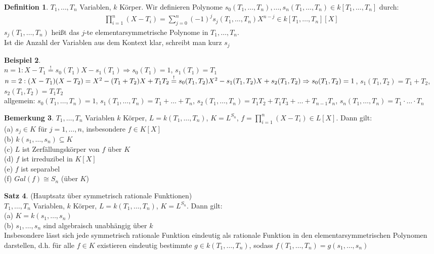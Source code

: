 \documentclass[10pt,a4paper,numbers=endperiod]{scrreprt}
\theoremstyle{definition}
\newtheorem{satz}{Satz}[section]
\newtheorem{defi}[satz]{Definition}
\newtheorem{bem}[satz]{Bemerkung}
\newtheorem{bsp}[satz]{Beispiel}
\begin{document}
\begin{defi}
	$T_1, \ldots, T_n$ Variablen, $k$ Körper. Wir definieren Polynome $s_0(T_1, \ldots, T_n), \ldots, s_n(T_1, \ldots, T_n) \in k[T_1, \ldots, T_n]$ durch:
	\begin{align*}
		\prod\limits_{i = 1}^n (X - T_i) = \sum\limits_{j = 0}^n (-1)^j s_j(T_1, \ldots, T_n) X^{n-j} \in k[T_1, \ldots, T_n][X]
	\end{align*}
	$s_j(T_1, \ldots, T_n)$ heißt das $j$-te elementarsymmetrische Polynome in $T_1, \ldots, T_n$.\\
	Ist die Anzahl der Variablen aus dem Kontext klar, schreibt man kurz $s_j$
\end{defi}

\begin{bsp}
	$ $\\
	$n = 1: X - T_1 \overset{!}{=} s_0(T_1) X - s_1(T_1) \Rightarrow s_0(T_1) = 1$, $s_1(T_1) = T_1$\\
	$n = 2: (X-T_1)(X-T_2) = X^2 - (T_1 + T_2)X + T_1T_2 \overset{!}{=} s_0(T_1,T_2)X^2 - s_1(T_1,T_2)X + s_2(T_1,T_2)\\
	\Rightarrow s_0(T_1,T_2) = 1$, $s_1(T_1,T_2) = T_1 + T_2$, $s_2(T_1,T_2) = T_1T_2$\\
	allgemein: $s_0(T_1, \ldots, T_n) = 1$, $s_1(T_1, \ldots, T_n) = T_1 + \ldots + T_n$, $s_2(T_1, \ldots, T_n) = T_1T_2 + T_1T_3 + \ldots + T_{n-1}T_n$, $s_n(T_1, \ldots, T_n) = T_1 \cdot \ldots \cdot T_n$
\end{bsp}

\begin{bem}
	$T_1, \ldots, T_n$ Variablen $k$ Körper, $L = k(T_1, \ldots, T_n)$, $K = L^{S_n}$, $f = \prod\limits_{i = 1}^n(X- T_i) \in L[X]$. Dann gilt:\\
	(a) $s_j \in K$ für $j = 1, \ldots, n$, insbesondere $f \in K[X]$\\
	(b) $k(s_1, \ldots, s_n) \subseteq K$\\
	(c) $L$ ist Zerfällungskörper von $f$ über $K$\\
	(d) $f$ ist irreduzibel in $K[X]$\\
	(e) $f$ ist separabel\\
	(f) $Gal(f) \cong S_n$ (über $K$)
\end{bem}

\begin{satz}
	(Hauptsatz über symmetrisch rationale Funktionen)\\
	$T_1, \ldots, T_n$ Variablen, $k$ Körper, $L = k(T_1, \ldots, T_n)$, $K = L^{S_n}$. Dann gilt:\\
	(a) $K = k(s_1, \ldots, s_n)$\\
	(b) $s_1, \ldots, s_n$ sind algebraisch unabhängig über $k$\\
	Insbesondere lässt sich jede symmetrisch rationale Funktion eindeutig als rationale Funktion in den elementarsymmetrischen Polynomen darstellen, d.h. für alle $f \in K$ existieren eindeutig bestimmte $g \in k(T_1, \ldots, T_n)$, sodass $f(T_1, \ldots, T_n) = g(s_1, \ldots, s_n)$
\end{satz}
\end{document}
